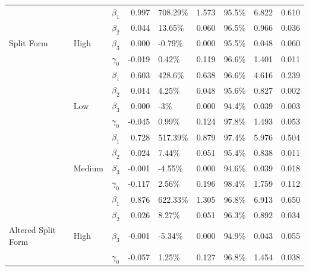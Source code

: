 \documentclass{svjour3}\usepackage[]{graphicx}\usepackage[]{color}
\newenvironment{knitrout}{}{} %
\begin{document}
\begin{knitrout}
\begin{table}[!h]
{\begin{tabular}[t]{l|l|l|r|l|r|l|r|r}
 &  & $\beta_1$ & 0.997 & 708.29\% & 1.573 & 95.5\% & 6.822 & 0.610\\

 &  & $\beta_2$ & 0.044 & 13.65\% & 0.060 & 96.5\% & 0.966 & 0.036\\

\multirow{-12}{*}{\raggedright\arraybackslash Split Form} & \multirow{-4}{*}{\raggedright\arraybackslash High} & $\beta_3$ & 0.000 & -0.79\% & 0.000 & 95.5\% & 0.048 & 0.060\\
\cline{1-9}
 &  & $\gamma_0$ & -0.019 & 0.42\% & 0.119 & 96.6\% & 1.401 & 0.011\\

 &  & $\beta_1$ & 0.603 & 428.6\% & 0.638 & 96.6\% & 4.616 & 0.239\\

 &  & $\beta_2$ & 0.014 & 4.25\% & 0.048 & 95.6\% & 0.827 & 0.002\\

 & \multirow{-4}{*}{\raggedright\arraybackslash Low} & $\beta_3$ & 0.000 & -3\% & 0.000 & 94.4\% & 0.039 & 0.003\\

 &  & $\gamma_0$ & -0.045 & 0.99\% & 0.124 & 97.8\% & 1.493 & 0.053\\

 &  & $\beta_1$ & 0.728 & 517.39\% & 0.879 & 97.4\% & 5.976 & 0.504\\

 &  & $\beta_2$ & 0.024 & 7.44\% & 0.051 & 95.4\% & 0.838 & 0.011\\

 & \multirow{-4}{*}{\raggedright\arraybackslash Medium} & $\beta_3$ & -0.001 & -4.55\% & 0.000 & 94.6\% & 0.039 & 0.018\\

 &  & $\gamma_0$ & -0.117 & 2.56\% & 0.196 & 98.4\% & 1.759 & 0.112\\

 &  & $\beta_1$ & 0.876 & 622.33\% & 1.305 & 96.8\% & 6.913 & 0.650\\

 &  & $\beta_2$ & 0.026 & 8.27\% & 0.051 & 96.3\% & 0.892 & 0.034\\

\multirow{-12}{*}{\raggedright\arraybackslash Altered Split Form} & \multirow{-4}{*}{\raggedright\arraybackslash High} & $\beta_3$ & -0.001 & -5.34\% & 0.000 & 94.9\% & 0.043 & 0.055\\
\cline{1-9}
 &  & $\gamma_0$ & -0.057 & 1.25\% & 0.127 & 96.8\% & 1.454 & 0.038\\


\end{tabular}}
\end{table}
\end{knitrout}
\end{document}
